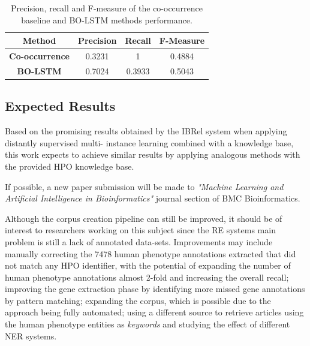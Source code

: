 \documentclass[11pt]{article}
\begin{document}
\begin{table}[!ht]
\small
\captionsetup{font=small}
\renewcommand\thetable{4.2}
\caption{Precision, recall and F-measure of the co-occurrence baseline and BO-LSTM methods performance.} 

\centering

\begin{tabular}{ |c|c|c|c| }

\hline
\rowcolor[HTML]{F5F5F5} \textbf{Method} & \textbf{Precision} & \textbf{Recall} & \textbf{F-Measure}\\

\hline
\cellcolor[HTML]{F5F5F5} \textbf{Co-occurrence} & 0.3231 & 1 & 0.4884 \\

\hline
\cellcolor[HTML]{F5F5F5} \textbf{BO-LSTM} & 0.7024 & 0.3933 & 0.5043 \\
	
\hline
\end{tabular}

\label{table:bolstm}
\end{table}


\subsection{Expected Results}

Based on the promising results obtained by the IBRel system \cite{10.1371/journal.pone.0171929} when applying distantly supervised multi-
instance learning combined with a knowledge base, this work expects to achieve similar results by applying analogous methods with the provided HPO knowledge base.

If possible, a new paper submission will be made to \textit{"Machine Learning and Artificial Intelligence in Bioinformatics"} journal section of BMC Bioinformatics.

Although the corpus creation pipeline can still be improved, it should be of interest to researchers working on this subject since the RE systems main problem is still a lack of annotated data-sets. Improvements may include manually correcting the 7478 human phenotype annotations extracted that did not match any HPO identifier, with the potential of expanding the number of human phenotype annotations almost 2-fold and increasing the overall recall; improving the gene extraction phase by identifying more missed gene annotations by pattern matching; expanding the corpus, which is possible due to the approach being fully automated;  using a different source to retrieve articles using the human phenotype entities as \textit{keywords} and studying the effect of different NER systems.
\end{document}
